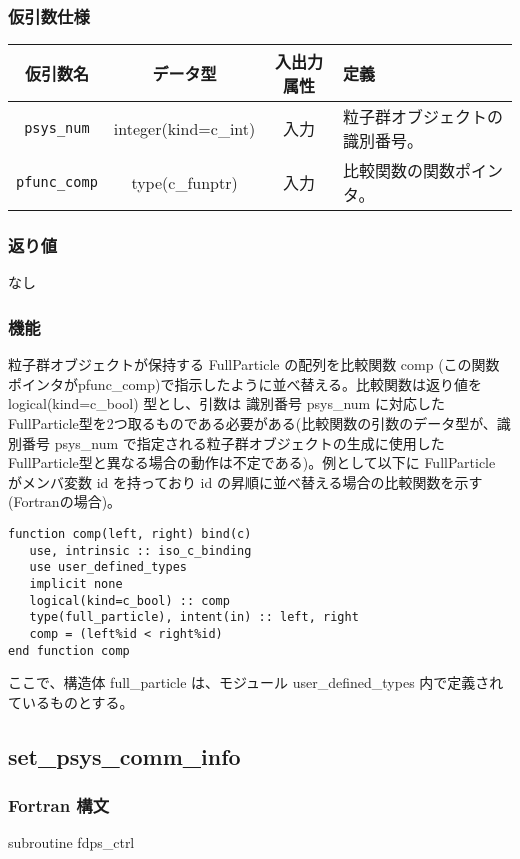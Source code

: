 \subsubsection*{仮引数仕様}
\begin{table}[h]
\begin{tabularx}{\linewidth}{cccX}
\toprule
\rowcolor{Snow2}
仮引数名 & データ型 & 入出力属性 & 定義 \\
\midrule
\texttt{psys\_num} & integer(kind=c\_int) & 入力 & 粒子群オブジェクトの識別番号。\\
\texttt{pfunc\_comp} & type(c\_funptr) & 入力 & 比較関数の関数ポインタ。\\
\bottomrule
\end{tabularx}
\end{table}

\subsubsection*{返り値}
なし

\subsubsection*{機能}
粒子群オブジェクトが保持する FullParticle の配列を比較関数 comp (この関数ポインタがpfunc\_comp)で指示したように並べ替える。比較関数は返り値を logical(kind=c\_bool) 型とし、引数は 識別番号 psys\_num に対応したFullParticle型を2つ取るものである必要がある(比較関数の引数のデータ型が、識別番号 psys\_num で指定される粒子群オブジェクトの生成に使用したFullParticle型と異なる場合の動作は不定である)。例として以下に FullParticle がメンバ変数 id を持っており id の昇順に並べ替える場合の比較関数を示す(Fortranの場合)。
\begin{lstlisting}[caption=比較関数の例]
function comp(left, right) bind(c)
   use, intrinsic :: iso_c_binding
   use user_defined_types
   implicit none
   logical(kind=c_bool) :: comp
   type(full_particle), intent(in) :: left, right
   comp = (left%id < right%id)
end function comp
\end{lstlisting}
ここで、構造体 full\_particle は、モジュール user\_defined\_types 内で定義されているものとする。

\subsection{set\_psys\_comm\_info}
\subsubsection*{Fortran 構文}
\begin{screen}
\begin{spverbatim}
subroutine fdps_ctrl%
\end{spverbatim}
\end{screen}

